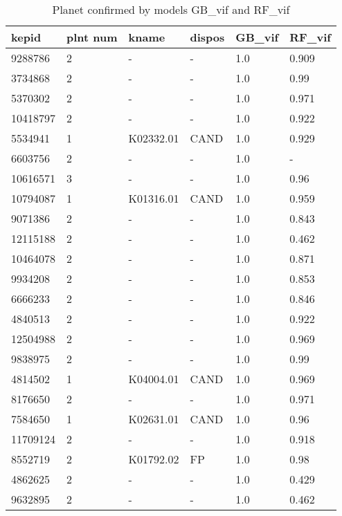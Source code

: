 \begin{table}[!htbp]
 \centering
 \caption{Planet confirmed by models GB\_vif and RF\_vif}
 \label{dataGBvifRFvifcreftab} 
  \begin{tabular}
{| 
 p{}| 
 p{}| 
 p{}| 
 p{}| 
 p{}| 
 p{}| 
}\hline 
\textbf{kepid} &\textbf{plnt num} &\textbf{kname} &\textbf{dispos} &\textbf{GB\_vif} &\textbf{RF\_vif} \\ \hline 
9288786 &2 &- &- &1.0 &0.909 \\ \hline 
3734868 &2 &- &- &1.0 &0.99 \\ \hline 
5370302 &2 &- &- &1.0 &0.971 \\ \hline 
10418797 &2 &- &- &1.0 &0.922 \\ \hline 
5534941 &1 &K02332.01 &CAND &1.0 &0.929 \\ \hline 
6603756 &2 &- &- &1.0 &- \\ \hline 
10616571 &3 &- &- &1.0 &0.96 \\ \hline 
10794087 &1 &K01316.01 &CAND &1.0 &0.959 \\ \hline 
9071386 &2 &- &- &1.0 &0.843 \\ \hline 
12115188 &2 &- &- &1.0 &0.462 \\ \hline 
10464078 &2 &- &- &1.0 &0.871 \\ \hline 
9934208 &2 &- &- &1.0 &0.853 \\ \hline 
6666233 &2 &- &- &1.0 &0.846 \\ \hline 
4840513 &2 &- &- &1.0 &0.922 \\ \hline 
12504988 &2 &- &- &1.0 &0.969 \\ \hline 
9838975 &2 &- &- &1.0 &0.99 \\ \hline 
4814502 &1 &K04004.01 &CAND &1.0 &0.969 \\ \hline 
8176650 &2 &- &- &1.0 &0.971 \\ \hline 
7584650 &1 &K02631.01 &CAND &1.0 &0.96 \\ \hline 
11709124 &2 &- &- &1.0 &0.918 \\ \hline 
8552719 &2 &K01792.02 &FP &1.0 &0.98 \\ \hline 
4862625 &2 &- &- &1.0 &0.429 \\ \hline 
9632895 &2 &- &- &1.0 &0.462 \\ \hline 

\end{tabular}
\end{table}
